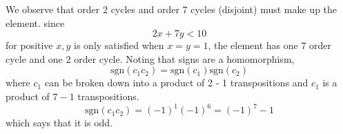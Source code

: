 \documentclass{article}
\begin{document}
\begin{enumerate}
		We observe that order 2 cycles and order 7 cycles (disjoint) must make up the element. since
		\begin{equation*}
			2x + 7y < 10
		\end{equation*}
		for positive $x, y$ is only satisfied when $x = y = 1$, the element has one $7$ order cycle and one $2$ order cycle. Noting that signs are a homomorphism, 
		\begin{equation*}
			\text{sgn}(c_{1}c_{2}) = \text{sgn}(c_{1})\text{sgn}(c_{2})
		\end{equation*}
		where $c_{1}$ can be broken down into a product of 2 - 1 transpositions and $c_{1}$ is a product of $7 - 1$ transpositions.
		\begin{equation*}
			\text{sgn}(c_{1}c_{2}) = (-1)^{1}(-1)^{6} = (-1)^{7} - 1
		\end{equation*}
		which says that it is odd.
\end{enumerate}
\end{document}
